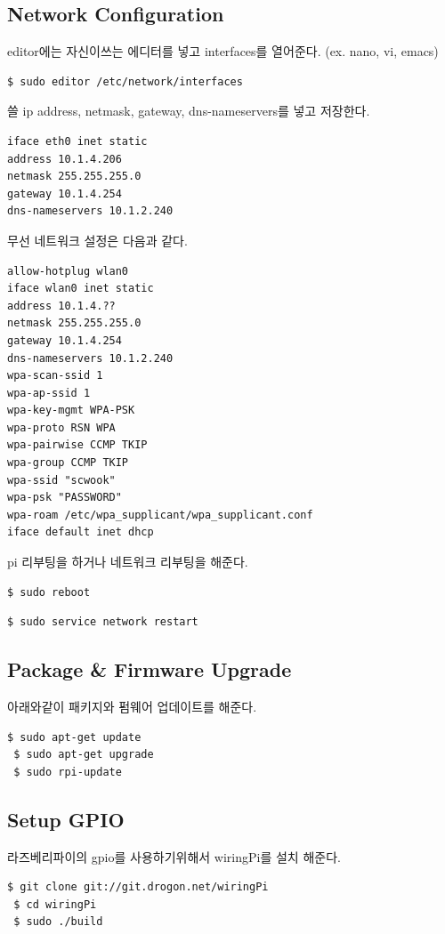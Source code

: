 \documentclass[11pt
  , a4paper
  , article
  , oneside
]{memoir}
\begin{document}
\subsection{Network Configuration}
editor에는 자신이쓰는 에디터를 넣고 interfaces를 열어준다. (ex. nano, vi, emacs)
\begin{lstlisting}[style=termstyle]
$ sudo editor /etc/network/interfaces
\end{lstlisting}
쓸 ip address, netmask, gateway, dns-nameservers를 넣고 저장한다.
\begin{lstlisting}[style=termstyle]
iface eth0 inet static
address 10.1.4.206
netmask 255.255.255.0
gateway 10.1.4.254
dns-nameservers 10.1.2.240
\end{lstlisting}
무선 네트워크 설정은 다음과 같다.
\begin{lstlisting}[style=termstyle]
allow-hotplug wlan0
iface wlan0 inet static
address 10.1.4.??
netmask 255.255.255.0
gateway 10.1.4.254
dns-nameservers 10.1.2.240
wpa-scan-ssid 1
wpa-ap-ssid 1 
wpa-key-mgmt WPA-PSK
wpa-proto RSN WPA
wpa-pairwise CCMP TKIP
wpa-group CCMP TKIP
wpa-ssid "scwook"
wpa-psk "PASSWORD"
wpa-roam /etc/wpa_supplicant/wpa_supplicant.conf
iface default inet dhcp
\end{lstlisting}
pi 리부팅을 하거나 네트워크 리부팅을 해준다.
\begin{lstlisting}[style=termstyle]
$ sudo reboot
\end{lstlisting}
\begin{lstlisting}[style=termstyle]
$ sudo service network restart
\end{lstlisting}
\subsection{Package \& Firmware Upgrade}
아래와같이 패키지와 펌웨어 업데이트를 해준다.
\begin{lstlisting}[style=termstyle]
 $ sudo apt-get update
 $ sudo apt-get upgrade
 $ sudo rpi-update
\end{lstlisting}
\subsection{Setup GPIO}
라즈베리파이의 gpio를 사용하기위해서 wiringPi를 설치 해준다.
\begin{lstlisting}[style=termstyle]
 $ git clone git://git.drogon.net/wiringPi
 $ cd wiringPi
 $ sudo ./build
\end{lstlisting}
\end{document}
